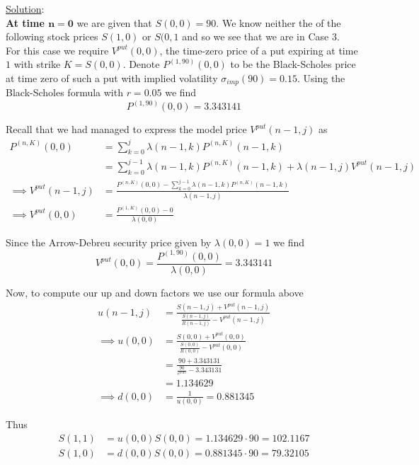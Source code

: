 \documentclass[12pt]{article}
\newlength\tindent
\renewcommand{\indent}{\hspace*{\tindent}}
\begin{document}
\underline{Solution}: \\
{\bf At time $\bm{n = 0}$} we are given that $S(0,0) = 90$. We know neither the of the following stock prices $S(1,0)$ or $S(0,1$ and so we see that we are in Case 3. \\

\indent For this case we require $V^{put}(0,0)$, the time-zero price of a put expiring at time $1$ with strike $K = S(0,0)$. Denote $P^{(1,90)}(0,0)$ to be the Black-Scholes price at time zero of such a put with implied volatility $\sigma_{imp}(90) = 0.15$. Using the Black-Scholes formula with $r = 0.05$ we find
\begin{equation*}
	P^{(1,90)}(0,0) = 3.343141
\end{equation*}

Recall that we had managed to express the model price $V^{put}(n - 1, j)$ as
\begin{align*}
	P^{(n,K)}(0,0) &= \sum^j_{k = 0} \lambda(n - 1, k) P^{(n,K)}(n - 1, k) \\
	&= \sum^{j - 1}_{k = 0} \lambda(n - 1, k)P^{(n, K)}(n - 1, k) + \lambda(n - 1, j)V^{put}(n - 1, j) \\
	\implies V^{put}(n - 1,j) &= \frac{ P^{(n, K)}(0,0) - \sum^{j - 1}_{k = 0} \lambda(n - 1, k) P^{(n, K)}(n - 1, k)}{ \lambda(n - 1, j)} \\
	\implies V^{put}(0,0) &= \frac{ P^{(1, K)}(0,0) - 0 }{ \lambda(0, 0)}
\end{align*}

Since the Arrow-Debreu security price given by $\lambda(0,0) = 1$ we find
\begin{equation*}
	V^{put}(0,0) = \frac{ P^{(1,90)}(0,0) }{ \lambda(0,0) } = 3.343141
\end{equation*}

Now, to compute our up and down factors we use our formula above
\begin{align*}
	u(n - 1, j) &= \frac{ S(n - 1, j) + V^{put}(n - 1, j) }{ \frac{S(n - 1, j)}{R(n - 1, j)} - V^{put}(n - 1, j) } \\
	\implies u(0,0) &=  \frac{ S(0,0) + V^{put}(0,0) }{ \frac{S(0,0)}{R(0,0)} - V^{put}(0,0) } \\
	&= \frac{ 90 + 3.343131 }{ \frac{90}{e^{0.05}} - 3.343131} \\
	&= 1.134629 \\
	\implies d(0,0) &= \frac{1}{u(0,0)} = 0.881345
\end{align*}

Thus
\begin{align*}
	S(1,1) &= u(0,0)S(0,0) = 1.134629\cdot 90 = 102.1167 \\
	S(1,0) &= d(0,0)S(0,0) = 0.881345\cdot 90 = 79.32105
\end{align*}
\end{document}
